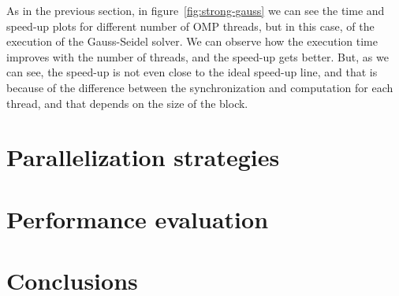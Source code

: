 As in the previous section, in figure~\ref{fig:strong-gauss} we can see the time and speed-up plots for different number 
of OMP threads, but in this case, of the execution of the Gauss-Seidel solver. We can observe how the execution time improves with the number of threads, and the speed-up gets better. But, as we can see, the speed-up is not even close to the ideal speed-up line, and that is because of the difference between the synchronization and computation for each thread, and that depends on the size of the block.



\section{Parallelization strategies}%
\label{sec:parallelization_strategies}

\section{Performance evaluation}%
\label{sec:performance_evaluation}

\section{Conclusions}%
\label{sec:conclusions}






